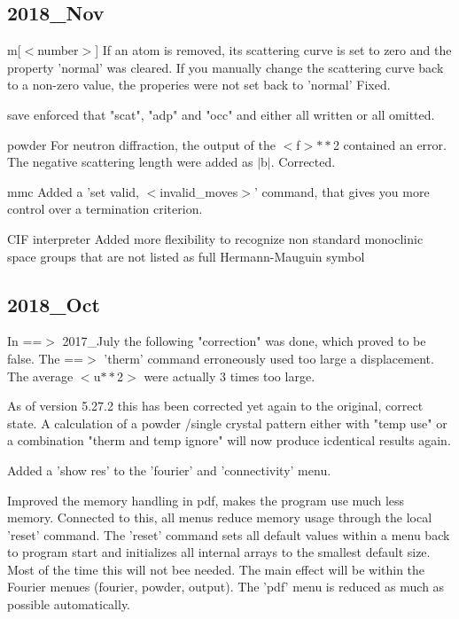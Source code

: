 \subsection*{2018\_Nov}
\par
m[$ <$number$> $] 
   If an atom is removed, its scattering curve is set to zero and 
   the property 'normal' was cleared. 
   If you manually change the scattering curve back to a non-zero 
   value, the properies were not set back to 'normal' Fixed. 
\par
save 
   enforced that "scat", "adp" and "occ" and either all written 
   or all omitted. 
\par
powder 
   For neutron diffraction, the output of the $ <$f$> $$**$2 contained an 
   error. The negative scattering length were added as $| $b$| $. 
   Corrected. 
\par
mmc 
   Added a 'set valid, $ <$invalid\_moves$> $' command, that gives you more 
   control over a termination criterion. 
\par
CIF interpreter 
   Added more flexibility to recognize non standard monoclinic space 
   groups that are not listed as full Hermann-Mauguin symbol 
\subsection*{2018\_Oct}
\par
In ==$> $ 2017\_July the following "correction" was done, which proved 
to be false. 
The ==$> $ 'therm' command erroneously used too large a displacement. 
The average $ <$u$**$2$> $ were actually 3 times too large. 
\par
As of version 5.27.2 this has been corrected yet again to the 
original, correct state. A calculation of a powder /single crystal 
pattern either with "temp use" or a combination "therm and temp ignore" 
will now produce icdentical results again. 
\par
Added a 'show res' to the 'fourier' and 'connectivity' menu. 
\par
Improved the memory handling in pdf, makes the program use much 
less memory. 
Connected to this, all menus reduce memory usage through the 
local 'reset' command. The 'reset' command sets all default 
values within a menu back to program start and initializes all 
internal arrays to the smallest default size. Most of the time 
this will not bee needed. The main effect will be within the 
Fourier menues (fourier, powder, output). The 'pdf' menu is 
reduced as much as possible automatically. 
\par
